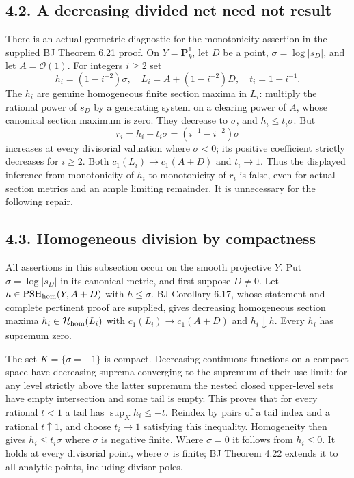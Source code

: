 \documentclass[
  10pt,
]{article}
\begin{document}
\subsection{4.2. A decreasing divided net need not
result}\label{a-decreasing-divided-net-need-not-result}

There is an actual geometric diagnostic for the monotonicity assertion
in the supplied BJ Theorem 6.21 proof. On \(Y=\mathbf P^1_k\), let \(D\)
be a point, \(\sigma=\log|s_D|\), and let \(A=\mathcal O(1)\). For
integers \(i\geq2\) set \[
 h_i=(1-i^{-2})\sigma,\quad L_i=A+(1-i^{-2})D,\quad t_i=1-i^{-1}.
\] The \(h_i\) are genuine homogeneous finite section maxima in \(L_i\):
multiply the rational power of \(s_D\) by a generating system on a
clearing power of \(A\), whose canonical section maximum is zero. They
decrease to \(\sigma\), and \(h_i\leq t_i\sigma\). But \[
 r_i=h_i-t_i\sigma=(i^{-1}-i^{-2})\sigma
 \tag{4.1}
\] increases at every divisorial valuation where \(\sigma<0\); its
positive coefficient strictly decreases for \(i\geq2\). Both
\(c_1(L_i)\to c_1(A+D)\) and \(t_i\to1\). Thus the displayed inference
from monotonicity of \(h_i\) to monotonicity of \(r_i\) is false, even
for actual section metrics and an ample limiting remainder. It is
unnecessary for the following repair.

\subsection{4.3. Homogeneous division by
compactness}\label{homogeneous-division-by-compactness}

All assertions in this subsection occur on the smooth projective \(Y\).
Put \(\sigma=\log|s_D|\) in its canonical metric, and first suppose
\(D\ne0\). Let \(h\in\operatorname{PSH}_{\rm hom}(Y,A+D)\) with
\(h\leq\sigma\). BJ Corollary 6.17, whose statement and complete
pertinent proof are supplied, gives decreasing homogeneous section
maxima \(h_i\in\mathcal H_{\rm hom}(L_i)\) with \(c_1(L_i)\to c_1(A+D)\)
and \(h_i\downarrow h\). Every \(h_i\) has supremum zero.

The set \(K=\{\sigma=-1\}\) is compact. Decreasing continuous functions
on a compact space have decreasing suprema converging to the supremum of
their usc limit: for any level strictly above the latter supremum the
nested closed upper-level sets have empty intersection and some tail is
empty. This proves that for every rational \(t<1\) a tail has
\(\sup_K h_i\leq-t\). Reindex by pairs of a tail index and a rational
\(t\uparrow1\), and choose \(t_i\to1\) satisfying this inequality.
Homogeneity then gives \(h_i\leq t_i\sigma\) where \(\sigma\) is
negative finite. Where \(\sigma=0\) it follows from \(h_i\leq0\). It
holds at every divisorial point, where \(\sigma\) is finite; BJ Theorem
4.22 extends it to all analytic points, including divisor poles.
\end{document}
